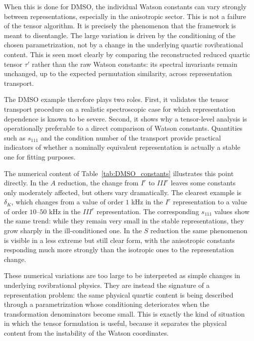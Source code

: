 When this is done for DMSO, the individual Watson constants can vary strongly
between representations, especially in the anisotropic sector. This is not a
failure of the tensor algorithm. It is precisely the phenomenon that the
framework is meant to disentangle. The large variation is driven by the
conditioning of the chosen parametrization, not by a change in the underlying
quartic rovibrational content. This is seen most clearly by comparing the
reconstructed reduced quartic tensor $\tau'$ rather than the raw Watson
constants: its spectral invariants remain unchanged, up to the expected
permutation similarity, across representation transport.

The DMSO example therefore plays two roles. First, it validates the tensor
transport procedure on a realistic spectroscopic case for which representation
dependence is known to be severe. Second, it shows why a tensor-level analysis
is operationally preferable to a direct comparison of Watson constants.
Quantities such as $s_{111}$ and the condition number of the transport provide
practical indicators of whether a nominally equivalent representation is
actually a stable one for fitting purposes.

The numerical content of Table~\ref{tab:DMSO_constants} illustrates this point
directly. In the $A$ reduction, the change from $I^r$ to $III^r$ leaves some
constants only moderately affected, but others vary dramatically. The clearest
example is $\delta_K$, which changes from a value of order $1$ kHz in the
$I^r$ representation to a value of order $10$--$50$ kHz in the $III^r$
representation. The corresponding $s_{111}$ values show the same trend: while
they remain very small in the stable representations, they grow sharply in the
ill-conditioned one. In the $S$ reduction the same phenomenon is visible in a
less extreme but still clear form, with the anisotropic constants responding
much more strongly than the isotropic ones to the representation change.

These numerical variations are too large to be interpreted as simple changes
in underlying rovibrational physics. They are instead the signature of a
representation problem: the same physical quartic content is being described
through a parametrization whose conditioning deteriorates when the transformation
denominators become small. This is exactly the kind of situation in which the
tensor formulation is useful, because it separates the physical content from
the instability of the Watson coordinates.

